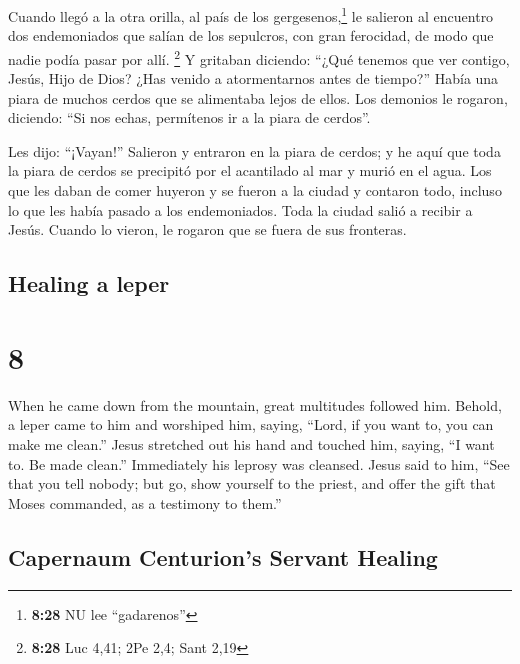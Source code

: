 \begin{paracol}{2}
 Cuando llegó a la otra orilla, al país de los
gergesenos,\footnote{\textbf{8:28} NU lee ``gadarenos''} le salieron al
encuentro dos endemoniados que salían de los sepulcros, con gran
ferocidad, de modo que nadie podía pasar por allí. \footnote{\textbf{8:28}
  Luc 4,41; 2Pe 2,4; Sant 2,19}  Y gritaban diciendo:
``¿Qué tenemos que ver contigo, Jesús, Hijo de Dios? ¿Has venido a
atormentarnos antes de tiempo?''  Había una piara de
muchos cerdos que se alimentaba lejos de ellos.  Los
demonios le rogaron, diciendo: ``Si nos echas, permítenos ir a la piara
de cerdos''.

 Les dijo: ``¡Vayan!'' Salieron y entraron en la piara de
cerdos; y he aquí que toda la piara de cerdos se precipitó por el
acantilado al mar y murió en el agua.  Los que les daban
de comer huyeron y se fueron a la ciudad y contaron todo, incluso lo que
les había pasado a los endemoniados.  Toda la ciudad
salió a recibir a Jesús. Cuando lo vieron, le rogaron que se fuera de
sus fronteras.

\switchcolumn
\begin{otherlanguage}{english}

\hypertarget{healing-a-leper}{%
\subsection{Healing a leper}\label{healing-a-leper}}

\hypertarget{section-15}{%
\section{8}\label{section-15}}

 When he came down from the mountain, great multitudes
followed him.  Behold, a leper came to him and worshiped
him, saying, ``Lord, if you want to, you can make me clean.''
 Jesus stretched out his hand and touched him, saying, ``I
want to. Be made clean.'' Immediately his leprosy was cleansed.
 Jesus said to him, ``See that you tell nobody; but go,
show yourself to the priest, and offer the gift that Moses commanded, as
a testimony to them.''

\hypertarget{capernaum-centurions-servant-healing}{%
\subsection{Capernaum Centurion's Servant
Healing}\label{capernaum-centurions-servant-healing}}


\end{otherlanguage}
\end{paracol}
